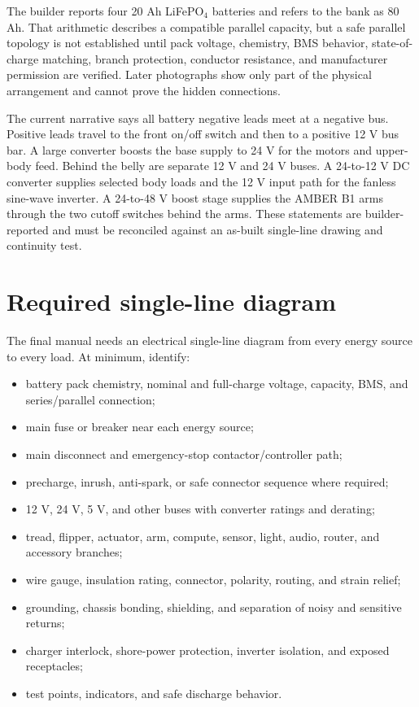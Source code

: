 \documentclass[10pt,openany]{book}
\begin{document}
The builder reports four 20 Ah LiFePO$_4$ batteries and refers to the bank as 80 Ah. That arithmetic describes a compatible parallel capacity, but a safe parallel topology is not established until pack voltage, chemistry, BMS behavior, state-of-charge matching, branch protection, conductor resistance, and manufacturer permission are verified. Later photographs show only part of the physical arrangement and cannot prove the hidden connections.

The current narrative says all battery negative leads meet at a negative bus. Positive leads travel to the front on/off switch and then to a positive 12 V bus bar. A large converter boosts the base supply to 24 V for the motors and upper-body feed. Behind the belly are separate 12 V and 24 V buses. A 24-to-12 V DC converter supplies selected body loads and the 12 V input path for the fanless sine-wave inverter. A 24-to-48 V boost stage supplies the AMBER B1 arms through the two cutoff switches behind the arms. These statements are builder-reported and must be reconciled against an as-built single-line drawing and continuity test.

\ROBPowerArchitectureDiagram


\section{Required single-line diagram}

The final manual needs an electrical single-line diagram from every energy source to every load. At minimum, identify:

\begin{itemize}
  \item battery pack chemistry, nominal and full-charge voltage, capacity, BMS, and series/parallel connection;
  \item main fuse or breaker near each energy source;
  \item main disconnect and emergency-stop contactor/controller path;
  \item precharge, inrush, anti-spark, or safe connector sequence where required;
  \item 12 V, 24 V, 5 V, and other buses with converter ratings and derating;
  \item tread, flipper, actuator, arm, compute, sensor, light, audio, router, and accessory branches;
  \item wire gauge, insulation rating, connector, polarity, routing, and strain relief;
  \item grounding, chassis bonding, shielding, and separation of noisy and sensitive returns;
  \item charger interlock, shore-power protection, inverter isolation, and exposed receptacles;
  \item test points, indicators, and safe discharge behavior.
\end{itemize}
\end{document}
